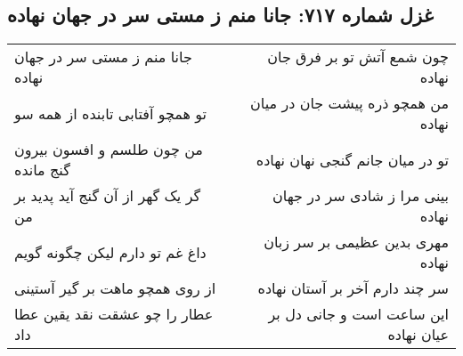 \begin{center}
\section*{غزل شماره ۷۱۷: جانا منم ز مستی سر در جهان نهاده}
\label{sec:717}
\begin{longtable}{l p{0.5cm} r}
جانا منم ز مستی سر در جهان نهاده
&&
چون شمع آتش تو بر فرق جان نهاده
\\
تو همچو آفتابی تابنده از همه سو
&&
من همچو ذره پیشت جان در میان نهاده
\\
من چون طلسم و افسون بیرون گنج مانده
&&
تو در میان جانم گنجی نهان نهاده
\\
گر یک گهر از آن گنج آید پدید بر من
&&
بینی مرا ز شادی سر در جهان نهاده
\\
داغ غم تو دارم لیکن چگونه گویم
&&
مهری بدین عظیمی بر سر زبان نهاده
\\
از روی همچو ماهت بر گیر آستینی
&&
سر چند دارم آخر بر آستان نهاده
\\
عطار را چو عشقت نقد یقین عطا داد
&&
این ساعت است و جانی دل بر عیان نهاده
\\
\end{longtable}
\end{center}
